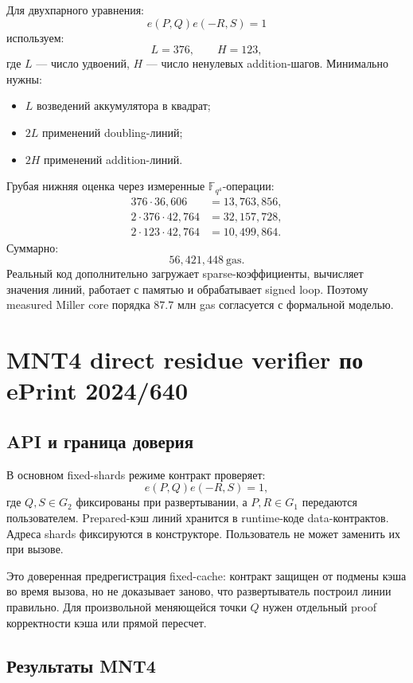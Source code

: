 \documentclass[12pt,a4paper]{article}
\newcommand{\Gas}{\mathrm{gas}}
\begin{document}
Для двухпарного уравнения:
\[
    e(P,Q)e(-R,S)=1
\]
используем:
\[
    L=376,\qquad H=123,
\]
где $L$ --- число удвоений, $H$ --- число ненулевых addition-шагов.
Минимально нужны:
\begin{itemize}
    \item $L$ возведений аккумулятора в квадрат;
    \item $2L$ применений doubling-линий;
    \item $2H$ применений addition-линий.
\end{itemize}
Грубая нижняя оценка через измеренные $\mathbb{F}_{q^4}$-операции:
\[
\begin{aligned}
    376\cdot 36{,}606 &= 13{,}763{,}856,\\
    2\cdot376\cdot42{,}764 &= 32{,}157{,}728,\\
    2\cdot123\cdot42{,}764 &= 10{,}499{,}864.
\end{aligned}
\]
Суммарно:
\[
    56{,}421{,}448\ \Gas.
\]
Реальный код дополнительно загружает sparse-коэффициенты, вычисляет значения
линий, работает с памятью и обрабатывает signed loop. Поэтому measured
Miller core порядка $87.7$ млн gas согласуется с формальной моделью.

\section{MNT4 direct residue verifier по ePrint 2024/640}

\subsection{API и граница доверия}

В основном fixed-shards режиме контракт проверяет:
\[
    e(P,Q)e(-R,S)=1,
\]
где $Q,S\in G_2$ фиксированы при развертывании, а $P,R\in G_1$ передаются
пользователем. Prepared-кэш линий хранится в runtime-коде data-контрактов.
Адреса shards фиксируются в конструкторе. Пользователь не может заменить их
при вызове.

Это доверенная предрегистрация fixed-cache: контракт защищен от подмены кэша
во время вызова, но не доказывает заново, что развертыватель построил линии
правильно. Для произвольной меняющейся точки $Q$ нужен отдельный proof корректности
кэша или прямой пересчет.

\subsection{Результаты MNT4}
\end{document}
